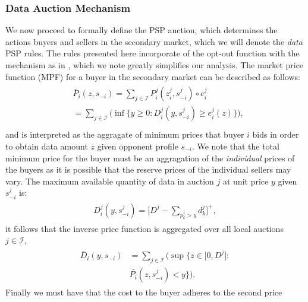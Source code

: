 \documentclass[12pt]{article}
\theoremstyle{definition}
\newcommand{\vs}{\varsigma}
\newcommand{\mcI}{\mathcal{I}}
\begin{document}
\begin{multicols}{2}
\subsubsection{Data Auction Mechanism}\label{datamechanism}
We now proceed to formally define the PSP auction, which determines the actions 
buyers and sellers in the secondary market, which we will denote the \emph{data}
PSP rules. The rules presented here incorporate of the opt-out function with the
mechanism as in \cite{lazar}, which we note greatly simplifies our
analysis. 
The market price function (MPF) for a buyer in the secondary market
can be described as follows:
\begin{align}\label{dataprice}
\begin{split}
    &\bar{P}_i(z, s_{-i}) =\displaystyle\sum_{j\in\mcI}P_i^j(z_i^j,
s_{-i}^j) \circ e_i^j \\
    &= \sum_{j\in\mcI}\bigg(\inf\bigg\lbrace y\ge 0 : 
    {D_i^j}(y,s_{-i}^j) \ge e_i^j(z) \bigg\rbrace \bigg),\\
\end{split}
\end{align}
and is interpreted as the aggragate of minimum prices that buyer $i$ bids in
order to obtain
data amount $z$ given opponent profile $s_{-i}$. We note that
the total minimum price for the buyer must be an aggragation of the
\emph{individual} prices of the buyers as it is possible that the reserve prices of the individual sellers may vary.
The maximum available quantity of data in auction
$j$ at unit price $y$ given $s_{-i}^j$ is: 
\begin{align}
\begin{split}\label{datacomposed}
    D_i^j(y,s_{-i}^j) = \bigg\lbrack D^j - \sum_{p_k^j> y} d_k^j\bigg\rbrack^+,
\end{split}
\end{align}
it follows that the inverse price function is aggregated over all local auctions
$j\in \mcI$,
\begin{align}\label{datapriceinverse}
\begin{split}
    \bar{D}_i(y, s_{-i}) &= \displaystyle\sum_{j\in\mcI}\bigg(\sup\bigg\lbrace z\in \big[ 0,
    D^j \big] : \\
    &\bar{P_i}(z,s_{-i}^j) < y\bigg\rbrace\bigg).
\end{split}
\end{align}
Finally we must have that the cost to the buyer adheres to the second price

\end{multicols}
\end{document}
